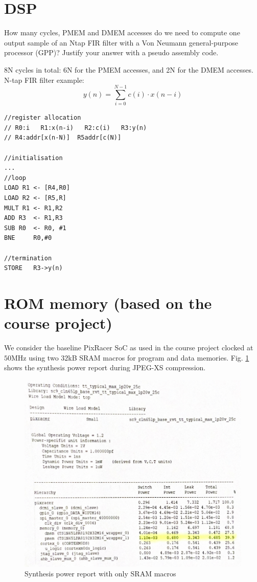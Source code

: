 \documentclass[fr]{sourcefiles/eplexam} %
\begin{document}
\section{DSP}
\noindent How many cycles, PMEM and DMEM accesses do we need to compute one output sample of an Ntap FIR filter with a Von Neumann general-purpose processor (GPP)? Justify your answer with a pseudo assembly code.
\begin{solution}
8N cycles in total: 6N for the PMEM accesses, and 2N for the DMEM accesses.
N-tap FIR filter example: 
$$y(n)=\sum^{N-1}_{i=0}c(i)\cdot x(n-i)$$

\begin{lstlisting}[style={verilog-style}]
//register allocation
// R0:i   R1:x(n-i)   R2:c(i)   R3:y(n) 
// R4:addr[x(n-N)]  R5addr[c(N)]

//initialisation
...
//loop
LOAD R1 <- [R4,R0]   
LOAD R2 <- [R5,R]   
MULT R1 <- R1,R2
ADD R3  <- R1,R3
SUB R0  <- R0, #1
BNE     R0,#0  

//termination
STORE   R3->y(n)
\end{lstlisting}

\end{solution}

\pagebreak
\section{ROM memory (based on the course project)}
\noindent We consider the baseline PixRacer SoC as used in the course project clocked at $50 \mathrm{MHz}$ using two $32$kB SRAM macros for program and data memories. Fig. \ref{fig:projectP1} shows the synthesis power report during JPEG-XS compression.

\begin{figure}[h]
    \centering
    \includegraphics[width=\textwidth]{projectQuestionP1.png}
    \caption{Synthesis power report with only SRAM macros}
    \label{fig:projectP1}
\end{figure}
\end{document}
